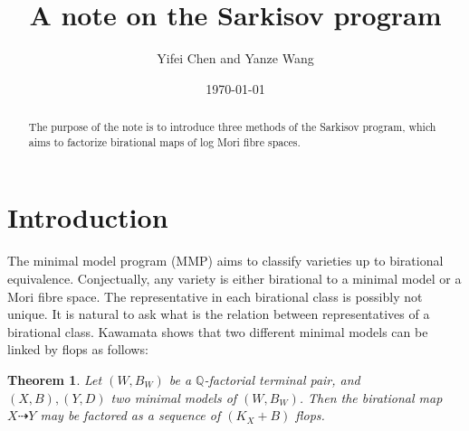 \documentclass[11pt]{amsart}
\newtheorem{thm}[defn]{Theorem}
\begin{document}
\title{A note on the Sarkisov program}

\author{Yifei Chen and Yanze Wang}

\begin{abstract}
The purpose of the note is to introduce three methods of the Sarkisov program, which aims to factorize birational maps of log Mori fibre spaces.
\end{abstract}
\address{Academy of Mathematics and Systems Science,
Chinese Academy of Sciences.
No. 55 Zhonguancun East Road, Haidian District,
Beijing 100190, P. R. China.}

\date{\today}


\maketitle

\tableofcontents


\section{Introduction}

The minimal model program (MMP)  aims to classify varieties up to birational equivalence.
Conjectually, any variety is either birational to  a minimal model  or a Mori fibre space. The representative in each birational class is possibly not unique. It is natural to ask what is the relation between representatives of a birational class.
Kawamata shows that two different minimal models can be linked by flops as follows:
\begin{thm}
  \cite[Theorem 1]{kawamataFlopsConnectMinimal2008} Let $(W,B_W)$ be a $\mathbb{Q}$-factorial terminal pair, and $(X,B),(Y,D)$  two minimal models of $(W,B_W)$. Then the birational map $X\dashrightarrow Y$ may be factored as a sequence of $(K_X+B)$ flops. 
\end{thm}
\end{document}
